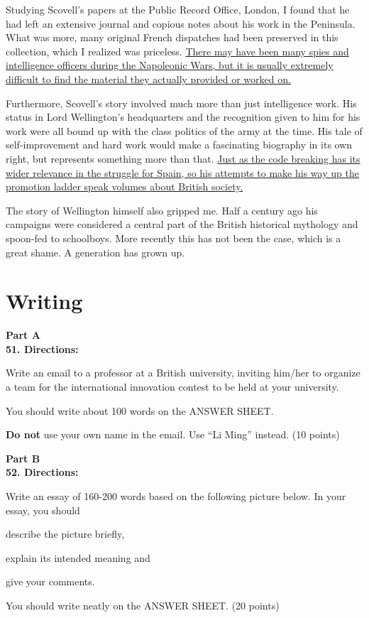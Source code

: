 Studying Scovell's papers at the Public Record Office, London, I found
that he had left an extensive journal
and copious notes about his work in the Peninsula. What was more, many
original French dispatches had been
preserved in this collection, which I realized was priceless. \transnum  \uline{There
may have been many spies and intelligence
officers during the Napoleonic Wars, but it is usually extremely
difficult to find the material they actually
provided or worked on.}



Furthermore, Scovell's story involved much more than just intelligence
work. His status in Lord Wellington's
headquarters and the recognition given to him for his work were all
bound up with the class politics of the army at
the time. His tale of self-improvement and hard work would make a
fascinating biography in its own right, but
represents something more than that. \transnum  \uline{Just as the code breaking has
its wider relevance in the struggle for
Spain, so his attempts to make his way up the promotion ladder speak
volumes about British society.}




The story of Wellington himself also gripped me. Half a century ago his
campaigns were considered a central
part of the British historical mythology and spoon-fed to schoolboys.
More recently this has not been the case,
which is a great shame. A generation has grown up.



\newpage
\section{Writing}


\noindent
\textbf{Part A}\\
\textbf{51. Directions:}

Write an email to a professor at a British university, inviting him/her
to organize a team for the international
innovation contest to be held at your university.

You should write about 100 words on the ANSWER SHEET.

\textbf{Do not} use your own name in the email. Use ``Li Ming'' instead. (10
points)


\vspace{2em}

\noindent
\textbf{Part B}\\
\textbf{52. Directions:}

Write an essay of 160-200 words based on the following picture below. In
your essay, you should
\begin{listwrite}
\item 
 describe the picture briefly,

\item 
 explain its intended meaning and

\item 
 give your comments.
\end{listwrite}

You should write neatly on the ANSWER SHEET. (20 points)

\begin{figure}[h!]
	\centering
	
\end{figure}



